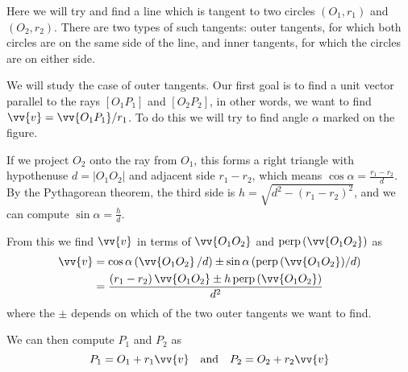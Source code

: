 Here we will try and find a line which is tangent to two circles $(O_1,r_1)$ and $(O_2,r_2)$. There are two types of such tangents: outer tangents, for which both circles are on the same side of the line, and inner tangents, for which the circles are on either side.




We will study the case of outer tangents. Our first goal is to find a unit vector parallel to the rays $[O_1P_1]$ and $[O_2P_2]$, in other words, we want to find $\vv{v} = \vv{O_1P_1}/r_1$. To do this we will try to find angle $\alpha$ marked on the figure.


If we project $O_2$ onto the ray from $O_1$, this forms a right triangle with hypothenuse $d=|O_1O_2|$ and adjacent side $r_1-r_2$, which means $\cos\alpha = \frac{r_1-r_2}{d}$. By the Pythagorean theorem, the third side is $h = \sqrt{d^2-(r_1-r_2)^2}$, and we can compute $\sin\alpha = \frac{h}{d}$.

From this we find $\vv{v}$ in terms of $\vv{O_1O_2}$ and $\perpop{\left(\vv{O_1O_2}\right)}$ as
\begin{align*}
\vv{v} &= \cos\alpha \left(\vv{O_1O_2}\,/d\right) \pm \sin\alpha \left(\perpop{\left(\vv{O_1O_2}\right)}/d\right)\\
&= \frac{(r_1-r_2)\,\vv{O_1O_2} \pm h \perpop{\left(\vv{O_1O_2}\right)}}{d^2}
\end{align*}
where the $\pm$ depends on which of the two outer tangents we want to find.

We can then compute $P_1$ and $P_2$ as 
\[P_1 = O_1 + r_1\vv{v} \quad \mbox{and} \quad P_2 = O_2 + r_2\vv{v}\]


